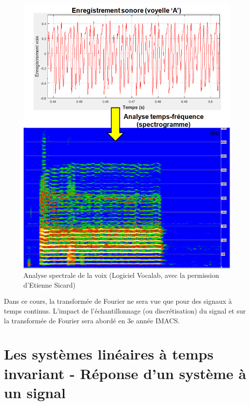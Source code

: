	\begin{figure}[h!]
		\centering
		\includegraphics[scale=0.5]{images/spectrogramme_voix.png} 
		\caption{Analyse spectrale de la voix (Logiciel Vocalab, avec la permission d'Etienne Sicard)}	
		\label{Fig:analyse_spectrale_voix}
	\end{figure}
	
	Dans ce cours, la transformée de Fourier ne sera vue que pour des signaux à temps continus. L'impact de l'échantillonnage (ou discrétisation) du signal et sur la transformée de Fourier sera abordé en 3e année IMACS.

	
	\section{Les systèmes linéaires à temps invariant - Réponse d'un système à un signal}
	
